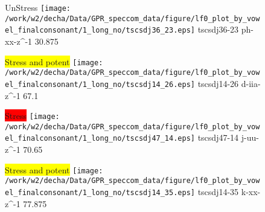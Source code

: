 \documentclass{article}
\begin{document}
\begin{figure}[t]
\begin{minipage}[b]{.24\textwidth}
UnStress
\centering
\texttt{[image: /work/w2/decha/Data/GPR\_speccom\_data/figure/lf0\_plot\_by\_vowel\_finalconsonant/1\_long\_no/tscsdj36\_23.eps]}
tscsdj36-23 ph-xx-z\textasciicircum-1 30.875
\end{minipage}
\begin{minipage}[b]{.24\textwidth}
\colorbox{yellow}{Stress and potent}
\centering
\texttt{[image: /work/w2/decha/Data/GPR\_speccom\_data/figure/lf0\_plot\_by\_vowel\_finalconsonant/1\_long\_no/tscsdj14\_26.eps]}
tscsdj14-26 d-iia-z\textasciicircum-1 67.1
\end{minipage}
\begin{minipage}[b]{.24\textwidth}
\colorbox{red}{Stress}
\centering
\texttt{[image: /work/w2/decha/Data/GPR\_speccom\_data/figure/lf0\_plot\_by\_vowel\_finalconsonant/1\_long\_no/tscsdj47\_14.eps]}
tscsdj47-14 j-uu-z\textasciicircum-1 70.65
\end{minipage}
\begin{minipage}[b]{.24\textwidth}
\colorbox{yellow}{Stress and potent}
\centering
\texttt{[image: /work/w2/decha/Data/GPR\_speccom\_data/figure/lf0\_plot\_by\_vowel\_finalconsonant/1\_long\_no/tscsdj14\_35.eps]}
tscsdj14-35 k-xx-z\textasciicircum-1 77.875
\end{minipage}
\end{figure}

\begin{figure}[t]
\end{figure}
\end{document}
